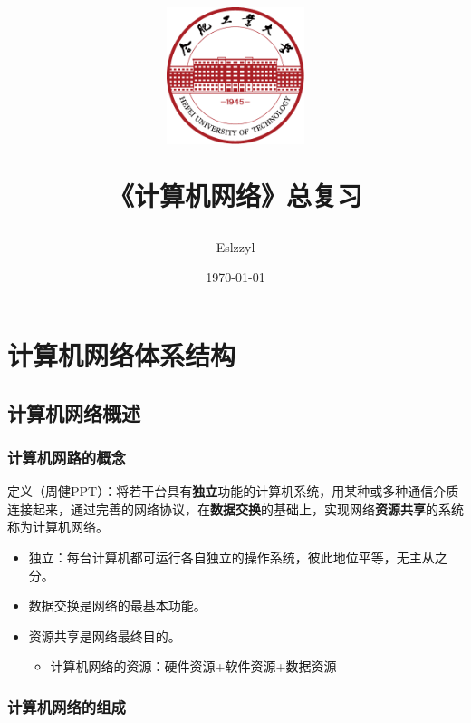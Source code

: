 \documentclass[12pt, a4paper, oneside]{ctexart}
\title{
    \includegraphics[width=0.3\textwidth]{../../share/images/hfut-badge.pdf}
    
    \vspace{20pt}
    《计算机网络》总复习
}
\author{Eslzzyl}
\date{\today}
\begin{document}
\maketitle
\newpage
\tableofcontents
\vspace{20pt}

\newpage

\section{计算机网络体系结构}

\subsection{计算机网络概述}

\subsubsection{计算机网路的概念}

定义（周健PPT）：将若干台具有\textbf{独立}功能的计算机系统，用某种或多种通信介质连接起来，通过完善的网络协议，在\textbf{数据交换}的基础上，实现网络\textbf{资源共享}的系统称为计算机网络。 

\begin{itemize}
    \item 独立：每台计算机都可运行各自独立的操作系统，彼此地位平等，无主从之分。
    \item 数据交换是网络的最基本功能。
    \item 资源共享是网络最终目的。
    \begin{itemize}
        \item 计算机网络的资源：硬件资源+软件资源+数据资源
    \end{itemize}
\end{itemize}

\subsubsection{计算机网络的组成}
\end{document}
